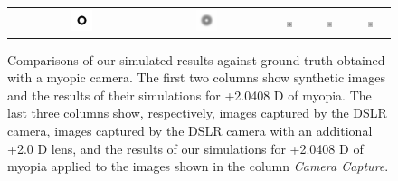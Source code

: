 \begin{figure}[!b]
\begin{tabular}{@{}r@{ } c@{ } c@{ } c@{ } c@{ } c }
	\begin{sideways} \parbox[b]{20mm} {} \end{sideways} &
	\includegraphics[width=0.185\textwidth]{__Images/05/WB_NCKZO_myopia/wb_O_20-200_Sloan@4x} &
	\includegraphics[width=0.185\textwidth]{__Images/05/WB_NCKZO_myopia/wb_O_20-200_Sloan@4x+2,00D(simulated)} &
	\includegraphics[width=0.185\textwidth]{__Images/05/WB_NCKZO_myopia/wb_O_20-200_Camera+0,00D} &
	\includegraphics[width=0.185\textwidth]{__Images/05/WB_NCKZO_myopia/wb_O_20-200_Camera+2,00D(lens)} &
	\includegraphics[width=0.185\textwidth]{__Images/05/WB_NCKZO_myopia/wb_O_20-200_Camera+2,00D(simulated)} \\

	\end{tabular}
	
	\caption[Comparisons of our simulated results against ground truth obtained with a myopic camera]{Comparisons of our simulated results against ground truth obtained with a myopic camera. 
		The first two columns show synthetic images and the results of their simulations for +2.0408 D of myopia. The last three columns show, respectively, images captured by the DSLR camera, images captured by the DSLR camera with an additional +2.0 D lens, and the results of our simulations for +2.0408 D of myopia applied to the images shown in the column {\it Camera Capture}.}
	\label{fig:myopia_nckzo_wb}
\end{figure}
